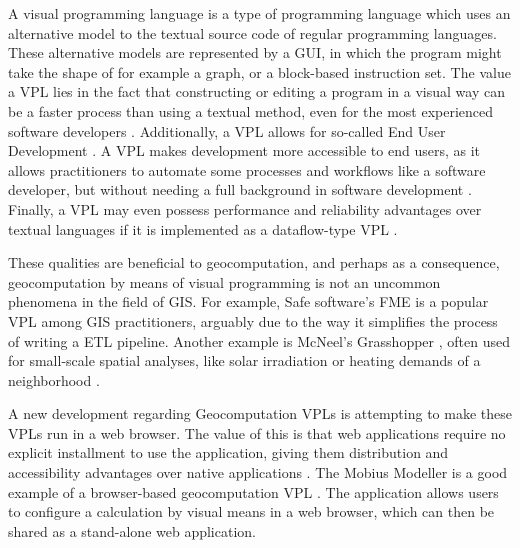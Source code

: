 

A visual programming language is a type of programming language which uses an alternative model to the textual source code of regular programming languages. 
These alternative models are represented by a \ac{GUI}, in which the program might take the shape of for example a graph, or a block-based instruction set.
The value a VPL lies in the fact that constructing or editing a program in a visual way can be a faster process than using a textual method, even for the most experienced software developers \citep{green_usability_1996, kuhail_characterizing_2021}.
Additionally, a \ac{VPL} allows for so-called End User Development \citep{kuhail_characterizing_2021}.
A \ac{VPL} makes development more accessible to end users, as it allows practitioners to automate some processes and workflows like a software developer, but without needing a full background in software development \citep{benac_recent_2022}. 
Finally, a VPL may even possess performance and reliability advantages over textual languages if it is implemented as a dataflow-type VPL \citep{sousa_dataflow_2012}. 

These qualities are beneficial to geocomputation, and perhaps as a consequence, geocomputation by means of visual programming is not an uncommon phenomena in the field of \ac{GIS}.
For example, Safe software's FME \citep{safe-software_fme_2022} is a popular \ac{VPL} among \ac{GIS} practitioners, arguably due to the way it simplifies the process of writing a \ac{ETL} pipeline. 
Another example is McNeel's Grasshopper \citep{rutten_grasshopper_2012}, often used for small-scale spatial analyses, like solar irradiation or heating demands of a neighborhood \citep{sadeghipour_roudsari_ladybug_2013}. 

A new development regarding Geocomputation VPLs is attempting to make these VPLs run in a web browser.
The value of this is that web applications require no explicit installment to use the application, giving them distribution and accessibility advantages over native applications \citep{kuhail_characterizing_2021, panidi_hybrid_2015}. 
The Mobius Modeller is a good example of a browser-based geocomputation VPL \citep{janssen_mobius_2021}.
The application allows users to configure a calculation by visual means in a web browser, which can then be shared as a stand-alone web application. 

